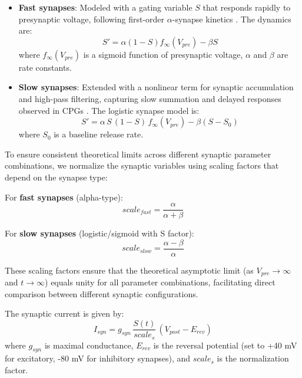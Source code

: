 \documentclass[nofootinbib,aip,amsmath,amssymb,reprint,twocolumn,10pt]{revtex4-2}
\begin{document}
\begin{itemize}
  \item \textbf{Fast synapses}: Modeled with a gating variable $S$ that responds rapidly to presynaptic voltage, following first-order $\alpha$-synapse kinetics \cite{destexhe1994synthesis, Wang-Rinzel-92, Rall67}. The dynamics are:
  \begin{equation}
    S' = \alpha (1-S) f_{\infty}(V_{pre}) - \beta S
  \end{equation}
  where $f_{\infty}(V_{pre})$ is a sigmoid function of presynaptic voltage, $\alpha$ and $\beta$ are rate constants.
  \item \textbf{Slow synapses}: Extended with a nonlinear term for synaptic accumulation and high-pass filtering, capturing slow summation and delayed responses observed in CPGs \cite{NW02, WNT02, TW05, SNLK11}. The logistic synapse model is:
  \begin{equation}
    S' = \alpha\, S\,(1-S)\, f_{\infty}(V_{pre}) - \beta (S-S_0)
  \end{equation}
  where $S_0$ is a baseline release rate.
\end{itemize}

To ensure consistent theoretical limits across different synaptic parameter combinations, we normalize the synaptic variables using scaling factors that depend on the synapse type:

For \textbf{fast synapses} (alpha-type):
\begin{equation}
  scale_{fast} = \frac{\alpha}{\alpha + \beta}
\end{equation}

For \textbf{slow synapses} (logistic/sigmoid with S factor):
\begin{equation}
  scale_{slow} = \frac{\alpha - \beta}{\alpha}
\end{equation}

These scaling factors ensure that the theoretical asymptotic limit (as $V_{pre} \to \infty$ and $t \to \infty$) equals unity for all parameter combinations, facilitating direct comparison between different synaptic configurations.

The synaptic current is given by:
\begin{equation}
  I_{syn} = g_{syn}\, \frac{S(t)}{scale_s}\, (V_{post}-E_{rev})
\end{equation}
where $g_{syn}$ is maximal conductance, $E_{rev}$ is the reversal potential (set to +40 mV for excitatory, -80 mV for inhibitory synapses), and $scale_s$ is the normalization factor.
\end{document}
